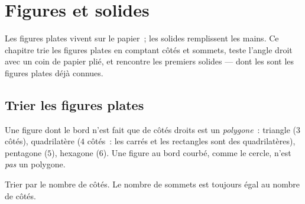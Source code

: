 \chapter{Figures et solides}\label{ch:g2:shapes}

Les figures plates vivent sur le papier~; les solides remplissent les
mains. Ce chapitre trie les figures plates en comptant côtés et
sommets, teste l'angle droit avec un coin de papier plié, et
rencontre les premiers solides --- dont les  sont les figures
plates déjà connues.

\section{Trier les figures plates}

\begin{definition}\label{def:g2:shapes:sort}
Une figure dont le bord n'est fait que de côtés droits est un
\emph{polygone}~: triangle ($3$ côtés), quadrilatère ($4$
côtés~: les carrés et les rectangles sont des
quadrilatères), pentagone ($5$), hexagone ($6$). Une figure au
bord courbé, comme le cercle, n'est \emph{pas} un polygone.
\end{definition}

\begin{omfigure}

{\small Trier par le nombre de côtés. Le nombre de sommets est
toujours égal au nombre de côtés.}
\end{omfigure}

